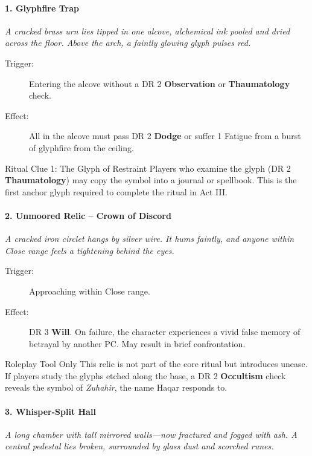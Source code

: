 \paragraph{1. Glyphfire Trap}
\textit{A cracked brass urn lies tipped in one alcove, alchemical ink pooled and dried across the floor. Above the arch, a faintly glowing glyph pulses red.}

\begin{description}
    \item[Trigger:] Entering the alcove without a DR 2 \textbf{Observation} or \textbf{Thaumatology} check.
    \item[Effect:] All in the alcove must pass DR 2 \textbf{Dodge} or suffer 1 Fatigue from a burst of glyphfire from the ceiling.
\end{description}

\begin{CommentBox}{Ritual Clue 1: The Glyph of Restraint}
    Players who examine the glyph (DR 2 \textbf{Thaumatology}) may copy the symbol into a journal or spellbook. This is the first anchor glyph required to complete the ritual in Act III.
\end{CommentBox}

\paragraph{2. Unmoored Relic – Crown of Discord}
\textit{A cracked iron circlet hangs by silver wire. It hums faintly, and anyone within Close range feels a tightening behind the eyes.}

\begin{description}
    \item[Trigger:] Approaching within Close range.
    \item[Effect:] DR 3 \textbf{Will}. On failure, the character experiences a vivid false memory of betrayal by another PC. May result in brief confrontation.
\end{description}

\begin{CommentBox}{Roleplay Tool Only}
    This relic is not part of the core ritual but introduces unease. If players study the glyphs etched along the base, a DR 2 \textbf{Occultism} check reveals the symbol of \textit{Zuhahir}, the name Haqar responds to.
\end{CommentBox}

\paragraph{3. Whisper-Split Hall}
\textit{A long chamber with tall mirrored walls—now fractured and fogged with ash. A central pedestal lies broken, surrounded by glass dust and scorched runes.}

